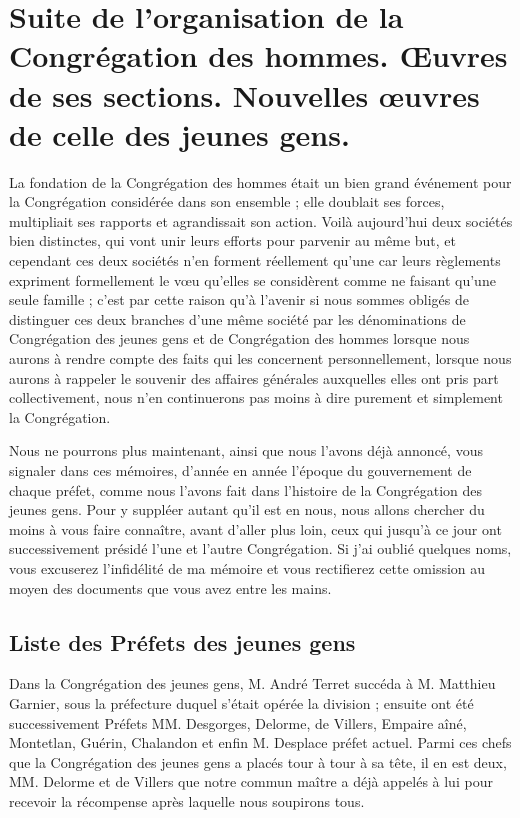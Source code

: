 \chapter{Suite de l'organisation de la Congrégation des hommes. Œuvres de ses sections. Nouvelles œuvres de celle des jeunes gens.}

La fondation de la Congrégation des hommes était un bien grand événement pour la Congrégation considérée dans son ensemble ; elle doublait ses forces, multipliait ses rapports et agrandissait son action. Voilà aujourd'hui deux sociétés bien distinctes, qui vont unir leurs efforts pour parvenir au même but, et cependant ces deux sociétés n'en forment réellement qu'une car leurs règlements expriment formellement le vœu qu'elles se considèrent comme ne faisant qu'une seule famille ; c'est par cette raison qu'à l'avenir si nous sommes obligés de distinguer ces deux branches d'une même société par les dénominations de Congrégation des jeunes gens et de Congrégation des hommes lorsque nous aurons à rendre compte des faits qui les concernent personnellement, lorsque nous aurons à rappeler le souvenir des affaires générales auxquelles elles ont pris part collectivement, nous n'en continuerons pas moins à dire purement et simplement la Congrégation.

Nous ne pourrons plus maintenant, ainsi que nous l'avons déjà annoncé, vous signaler dans ces mémoires, d'année en année l'époque du gouvernement de chaque préfet, comme nous l'avons fait dans l'histoire de la Congrégation des jeunes gens. Pour
y suppléer autant qu'il est en nous, nous allons chercher du moins à vous faire connaître, avant d'aller plus loin, ceux qui jusqu'à ce jour ont successivement présidé l'une et l'autre Congrégation. Si j'ai oublié quelques noms, vous excuserez l'infidélité de ma mémoire et vous rectifierez cette omission au moyen des documents que vous avez entre les mains.

\section*{Liste des Préfets des jeunes gens}
Dans la Congrégation des jeunes gens, M. André Terret succéda à M. Matthieu Garnier, sous la préfecture duquel s'était opérée la division ; ensuite ont été successivement Préfets MM. Desgorges, Delorme, de Villers, Empaire aîné, Montetlan, Guérin, Chalandon et enfin M. Desplace préfet actuel. Parmi ces chefs que la Congrégation des jeunes gens a placés tour à tour à sa tête, il en est deux, MM. Delorme et de Villers que notre commun maître a déjà appelés à lui pour recevoir la récompense après laquelle nous soupirons tous.

